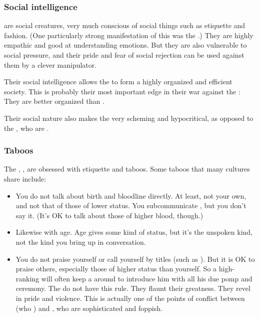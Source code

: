 \subsubsection{Social intelligence}
\Resphain{} are social creatures, very much conscious of social things such as etiquette and fashion. 
(One particularly strong manifestation of this was the \CiriathSepher{} .)
They are highly empathic and good at understanding emotions. 
But they are also vulnerable to social pressure, and their pride and fear of social rejection can be used against them by a clever manipulator. 

Their social intelligence allows the \resphain{} to form a highly organized and efficient society. 
This is probably their most important edge in their war against the \dragons: 
They are better organized than . 

Their social nature also makes the \resphain{} very scheming and hypocritical, as opposed to the \dragons, who are . 





\subsubsection{Taboos}
The \resphain, , are obsessed with etiquette and taboos. 
Some taboos that many \resphan{} cultures share include: 
\begin{itemize}
  \item 
    You do not talk about birth and bloodline directly. 
    At least, not your own, and not that of those of lower status. 
    You subcommunicate \quo{\ashenblood}, but you don't say it. 
    (It's OK to talk about those of higher blood, though.)
  \item 
    Likewise with age. 
    Age gives some kind of status, but it's the unspoken kind, not the kind you bring up in conversation. 
  \item 
    You do not praise yourself or call yourself by titles (such as ). 
    But it is OK to praise others, especially those of higher status than yourself. 
    So a high-ranking \resphan{} will often keep a  around to introduce him with all his due pomp and ceremony. 
    \subitem
      The \Mystraacht{} do not have this rule. 
      They flaunt their greatness. 
      They revel in pride and violence. 
      This is actually one of the points of conflict between \Mystraacht{} (who ) and \KiriathSepher, who are sophisticated and foppish. 
\end{itemize}





